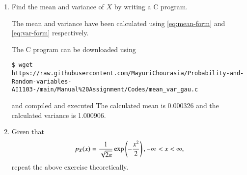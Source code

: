 \documentclass[journal,12pt,twocolumn]{IEEEtran}
\renewcommand\thesection{\arabic{section}}
\begin{document}
\begin{enumerate}[label=\thesection.\arabic*
,ref=\thesection.\theenumi]
\solution The PDF of $X$ is plotted in Fig. \ref{fig:gauss_pdf} using the code below
\begin{lstlisting}
$ wget https://raw.githubusercontent.com/MayuriChourasia/Probability-and-Random-variables-AI1103-/main/Manual%20Assignment/Codes/pdf_plot.py
\end{lstlisting}
The figure is generated using
\begin{lstlisting}
$ python pdf_plot.py
\end{lstlisting}
The properties of a PDF $p_X(x)$ are as follows:
		\begin{enumerate}
			\item $\forall x \in \mathbb{R}$, $p_X(x) \geq 0$
			\item $\int_{-\infty}^{\infty}p_X(x)dx = 1$
			\item For $a < b$, $a, b \in \mathbb{R}$ 
				\begin{align}
					\pr{a < X < b} &= \pr{a \leq X \leq b} \\
					&= \int_{a}^{b}p_X(x)dx
				\end{align}
				If we take $a = b$, then we get $\pr{X = a} = 0$.
		\end{enumerate}
\begin{figure}
\centering
\texttt{[image: gau\_pdf.png]}
\caption{The PDF of $X$}
\label{fig:gauss_pdf}
\end{figure}

\item Find the mean and variance of $X$ by writing a C program.

\solution
The mean and variance have been calculated using \eqref{eq:mean-form} and \eqref{eq:var-form} respectively.

\noindent The C program can be downloaded using
\begin{lstlisting}
$ wget https://raw.githubusercontent.com/MayuriChourasia/Probability-and-Random-variables-AI1103-/main/Manual%20Assignment/Codes/mean_var_gau.c
\end{lstlisting}
and compiled and executed
The calculated mean is 0.000326 and the calculated variance is 1.000906.

\item Given that 
\begin{align}
p_{X}(x) = \frac{1}{\sqrt{2\pi}}\exp\left(-\frac{x^2}{2}\right), -\infty < x < \infty,
\end{align}
repeat the above exercise theoretically.


\end{enumerate}
\end{document}
